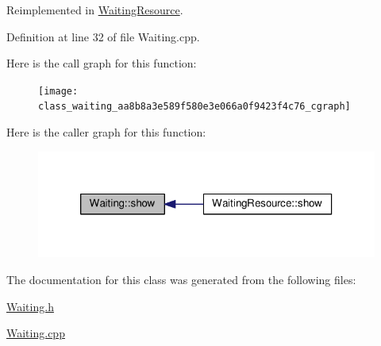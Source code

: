 Reimplemented in \hyperlink{class_waiting_resource_afb0323a90d99b50d66de7f38d069b122}{Waiting\-Resource}.



Definition at line 32 of file Waiting.\-cpp.



Here is the call graph for this function\-:\nopagebreak
\begin{figure}[H]
\begin{center}
\leavevmode
\texttt{[image: class\_waiting\_aa8b8a3e589f580e3e066a0f9423f4c76\_cgraph]}
\end{center}
\end{figure}




Here is the caller graph for this function\-:\nopagebreak
\begin{figure}[H]
\begin{center}
\leavevmode
\includegraphics[width=318pt]{class_waiting_aa8b8a3e589f580e3e066a0f9423f4c76_icgraph}
\end{center}
\end{figure}




The documentation for this class was generated from the following files\-:\begin{DoxyCompactItemize}
\item 
\hyperlink{_waiting_8h}{Waiting.\-h}\item 
\hyperlink{_waiting_8cpp}{Waiting.\-cpp}\end{DoxyCompactItemize}
